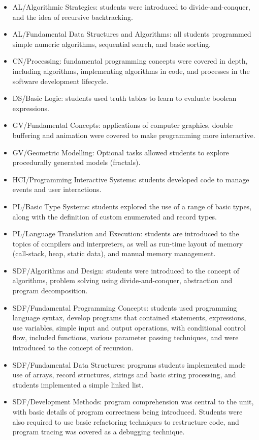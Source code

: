 \begin{itemize}[noitemsep,nolistsep]
	\item AL/Algorithmic Strategies: students were introduced to divide-and-conquer, and the idea of recursive backtracking.
	\item AL/Fundamental Data Structures and Algorithms: all students programmed simple numeric algorithms, sequential search, and basic sorting.
	\item CN/Processing: fundamental programming concepts were covered in depth, including algorithms,  implementing algorithms in code, and processes in the software development lifecycle.
	\item DS/Basic Logic: students used truth tables to learn to evaluate boolean expressions.
	\item GV/Fundamental Concepts: applications of computer graphics, double buffering and animation were covered to make programming more interactive.
	\item GV/Geometric Modelling: Optional tasks allowed students to explore procedurally generated models (fractals).
	\item HCI/Programming Interactive Systems: students developed code to manage events and user interactions.
	\item PL/Basic Type Systems: students explored the use of a range of basic types, along with the definition of custom enumerated and record types.
	\item PL/Language Translation and Execution: students are introduced to the topics of compilers and interpreters, as well as run-time layout of memory (call-stack, heap, static data), and manual memory management.
	\item SDF/Algorithms and Design: students were introduced to the concept of algorithms, problem solving using divide-and-conquer, abstraction and program decomposition.
	\item SDF/Fundamental Programming Concepts: students used programming language syntax, develop programs that contained statements, expressions, use variables, simple input and output operations, with conditional control flow, included functions, various parameter passing techniques, and were introduced to the concept of recursion.
	\item SDF/Fundamental Data Structures: programs students implemented made use of arrays, record structures, strings and basic string processing, and students implemented a simple linked list.
	\item SDF/Development Methods: program comprehension was central to the unit, with basic details of program correctness being introduced. Students were also required to use basic refactoring techniques to restructure code, and program tracing was covered as a debugging technique.

\end{itemize}

